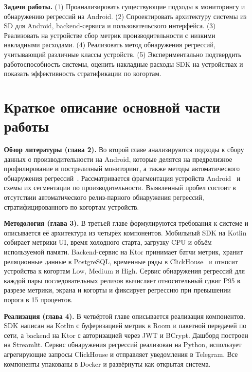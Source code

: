 \documentclass[14pt,a4paper]{extarticle}
\begin{document}
\textbf{Задачи работы.} (1) Проанализировать существующие подходы к мониторингу и обнаружению регрессий на Android. (2) Спроектировать архитектуру системы из SD для Android, backend-сервиса и пользовательского интерфейса. (3) Реализовать на устройстве сбор метрик производительности с низкими накладными расходами. (4) Реализовать метод обнаружения регрессий, учитывающий различные классы устройств. (5) Экспериментально  подтвердить работоспособность системы, оценить накладные расходы SDK на устройствах и показать эффективность стратификации по когортам.

\newpage

\section*{Краткое описание основной части работы}

\noindent\textbf{Обзор литературы (глава 2).} Во второй главе анализируются подходы к сбору данных о производительности на Android, которые делятся на предрелизное профилирование и пострелизный мониторинг, а также методы автоматического обнаружения регрессий~\cite{Nguyen2012, FBDetect}. Рассматривается фрагментация устройств Android~\cite{Zikan} и схемы их сегментации по производительности. Выявленный пробел состоит в отсутствии автоматического релиз-парного обнаружения регрессий, стратифицированного по когортам устройств.

\noindent\textbf{Методология (глава 3).} В третьей главе формулируются требования к системе и описывается её архитектура из четырёх компонентов. Мобильный SDK на Kotlin собирает метрики UI, время холодного старта, загрузку CPU и объём используемой памяти. Backend-сервис на Ktor принимает батчи метрик, хранит реляционные данные в PostgreSQL, временные ряды в ClickHouse~\cite{schulze2024clickhouse} и относит устройства к когортам Low, Medium и High. Сервис обнаружения регрессий для каждой пары последовательных релизов вычисляет относительный сдвиг P95 в разрезе метрики, экрана и когорты и фиксирует регрессию при превышении порога в 15 процентов.

\noindent\textbf{Реализация (глава 4).} В четвёртой главе описывается реализация компонентов. SDK написан на Kotlin с буферизацией метрик в Room и пакетной передачей по сети, а backend на Ktor с авторизацией через JWT и BCrypt. Дашборд построен на Streamlit. Сервис обнаружения регрессий реализован на Python, использует агрегирующие запросы ClickHouse и отправляет уведомления в Telegram. Все компоненты упакованы в Docker и развёрнуты как открытая система.
\end{document}
